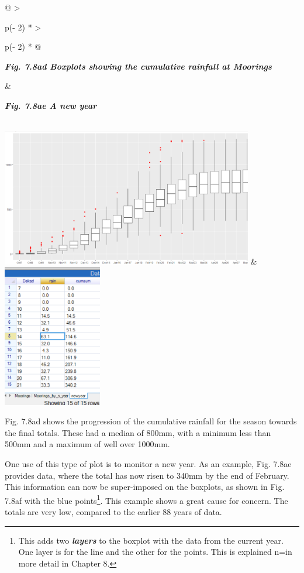 \documentclass[
  letterpaper,
  DIV=11,
  numbers=noendperiod]{scrreprt}
\begin{document}
\begin{longtable}[]{@{}
  >{\raggedright\arraybackslash}p{(\columnwidth - 2\tabcolsep) * }
  >{\raggedright\arraybackslash}p{(\columnwidth - 2\tabcolsep) * }@{}}
\toprule\noalign{}
\begin{minipage}[b]{\linewidth}\raggedright
\textbf{\emph{Fig. 7.8ad Boxplots showing the cumulative rainfall at
Moorings}}
\end{minipage} & \begin{minipage}[b]{\linewidth}\raggedright
\textbf{\emph{Fig. 7.8ae A new year}}
\end{minipage} \\
\midrule\noalign{}
\endhead
\bottomrule\noalign{}
\endlastfoot
\includegraphics[width=4.33254in,height=2.37555in]{figures/Fig7.8ad.png}
&
\includegraphics[width=1.69586in,height=2.44548in]{figures/Fig7.8ae.png} \\
\end{longtable}

Fig. 7.8ad shows the progression of the cumulative rainfall for the
season towards the final totals. These had a median of 800mm, with a
minimum less than 500mm and a maximum of well over 1000mm.

One use of this type of plot is to monitor a new year. As an example,
Fig. 7.8ae provides data, where the total has now risen to 340mm by the
end of February. This information can now be super-imposed on the
boxplots, as shown in Fig. 7.8af with the blue points\footnote{This adds
  two \textbf{\emph{layers}} to the boxplot with the data from the
  current year. One layer is for the line and the other for the points.
  This is explained n=in more detail in Chapter 8.}. This example shows
a great cause for concern. The totals are very low, compared to the
earlier 88 years of data.
\end{document}
